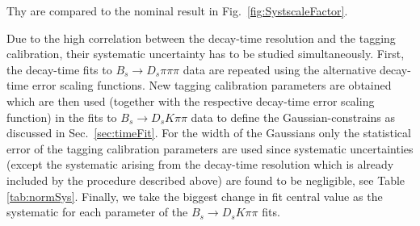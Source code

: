 



%

Thy are compared to the nominal result in Fig.~\ref{fig:SystscaleFactor}.

Due to the high correlation between the decay-time resolution and the tagging calibration, their systematic uncertainty has to be studied simultaneously.
First, the decay-time fits to $B_s \to D_s \pi\pi\pi$ data are repeated using the alternative decay-time error scaling functions.
New tagging calibration parameters are obtained which are then used (together with the respective decay-time error scaling function) in the fits to $B_s \to D_s K\pi\pi$ data
to define the Gaussian-constrains as discussed in Sec.~\ref{sec:timeFit}.
For the width of the Gaussians only the statistical error of the tagging calibration parameters are used since systematic uncertainties (except the systematic arising from the decay-time resolution which is already included by the procedure described above) are found to be negligible, see Table \ref{tab:normSys}.
Finally, we take the biggest change in fit central value as the systematic for each parameter of the $B_s \to D_s K\pi\pi$ fits.

